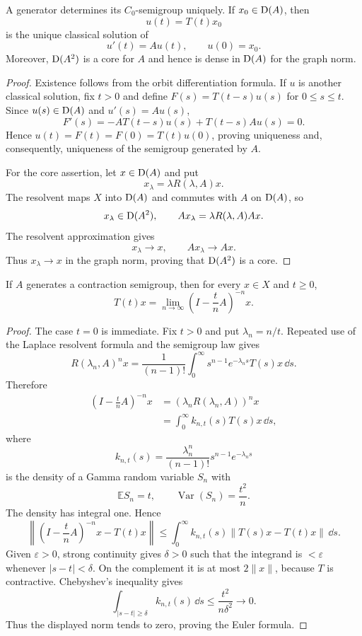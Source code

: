 \begin{notecorollary}
A generator determines its $C_0$-semigroup uniquely.  If $x_0\in\operatorname{D}(A)$,
then
\[
  u(t)=T(t)x_0
\]
is the unique classical solution of
\[
  u'(t)=Au(t),
  \qquad u(0)=x_0.
\]
Moreover, $\operatorname{D}(A^2)$ is a core for $A$ and hence is dense in $\operatorname{D}(A)$ for
the graph norm.
\end{notecorollary}

\begin{proof}
Existence follows from the orbit differentiation formula.  If $u$ is another
classical solution, fix $t>0$ and define $F(s)=T(t-s)u(s)$ for $0\le s\le t$.
Since $u(s)\in\operatorname{D}(A)$ and $u'(s)=Au(s)$,
\[
  F'(s)=-AT(t-s)u(s)+T(t-s)Au(s)=0.
\]
Hence $u(t)=F(t)=F(0)=T(t)u(0)$, proving uniqueness and, consequently,
uniqueness of the semigroup generated by $A$.

For the core assertion, let $x\in\operatorname{D}(A)$ and put
\[
  x_\lambda=\lambda R(\lambda,A)x.
\]
The resolvent maps $X$ into $\operatorname{D}(A)$ and commutes with $A$ on $\operatorname{D}(A)$, so
\[
  x_\lambda\in\operatorname{D}(A^2),
  \qquad
  Ax_\lambda=\lambda R(\lambda,A)Ax.
\]
The resolvent approximation gives
\[
  x_\lambda\to x,
  \qquad
  Ax_\lambda\to Ax.
\]
Thus $x_\lambda\to x$ in the graph norm, proving that $\operatorname{D}(A^2)$ is a core.
\end{proof}

\begin{notetheorem}
If $A$ generates a contraction semigroup, then for every $x\in X$ and $t\ge0$,
\[
  T(t)x
  =\lim_{n\to\infty}
     \left(I-\frac{t}{n}A\right)^{-n}x.
\]
\end{notetheorem}

\begin{proof}
The case $t=0$ is immediate.  Fix $t>0$ and put $\lambda_n=n/t$.  Repeated use
of the Laplace resolvent formula and the semigroup law gives
\[
  R(\lambda_n,A)^n x
  =\frac1{(n-1)!}\int_0^\infty
       s^{n-1}e^{-\lambda_ns}T(s)x\,\dd s.
\]
Therefore
\[
\begin{aligned}
  \left(I-\frac tnA\right)^{-n}x
   &=(\lambda_nR(\lambda_n,A))^n x\\
   &=\int_0^\infty k_{n,t}(s)T(s)x\,\dd s,
\end{aligned}
\]
where
\[
  k_{n,t}(s)
  =\frac{\lambda_n^n}{(n-1)!}s^{n-1}e^{-\lambda_ns}
\]
is the density of a Gamma random variable $S_n$ with
\[
  \mathbb E S_n=t,
  \qquad
  \operatorname{Var}(S_n)=\frac{t^2}{n}.
\]
The density has integral one.  Hence
\[
  \left\|\left(I-\frac tnA\right)^{-n}x-T(t)x\right\|
  \le\int_0^\infty k_{n,t}(s)\|T(s)x-T(t)x\|\,\dd s.
\]
Given $\varepsilon>0$, strong continuity gives $\delta>0$ such that the
integrand is $<\varepsilon$ whenever $|s-t|<\delta$.  On the complement it is
at most $2\|x\|$, because $T$ is contractive.  Chebyshev's inequality gives
\[
  \int_{|s-t|\ge\delta}k_{n,t}(s)\,\dd s
  \le\frac{t^2}{n\delta^2}\longrightarrow0.
\]
Thus the displayed norm tends to zero, proving the Euler formula.
\end{proof}

